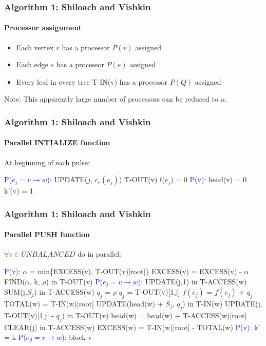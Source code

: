 \documentclass{beamer}
\begin{document}
\begin{frame}
\frametitle{Algorithm 1: Shiloach and Vishkin}
\framesubtitle{Processor assignment} 
\begin{itemize}
	\item Each vertex $v$ has a processor $P(v)$ assigned
	\item Each edge $e$ has a processor $P(e)$ assigned
	\item Every leaf in every tree T-IN(v) has a processor $P(Q)$ assigned
\end{itemize}
\bigskip
Note: This apparently large number of processors can be reduced to $n$.
\end{frame}

\begin{frame}
\frametitle{Algorithm 1: Shiloach and Vishkin}
\framesubtitle{Parallel INTIALIZE function} 
At beginning of each pulse:	
	\begin{algorithmic}[1]
		\State \textcolor{blue}{P($e_j = v \rightarrow w$):}
		\State UPDATE($j$, $c_r(e_j)$) T-OUT(v)
		\State f($e_j$) = 0
		\State \textcolor{blue}{P(v):}
		\State head(v) = 0	
		\State k'(v) = 1	
 	\EndFunction
	\end{algorithmic}
\end{frame}

\begin{frame}[allowframebreaks]
\frametitle{Algorithm 1: Shiloach and Vishkin}
\framesubtitle{Parallel PUSH function} 
\fontsize{10pt}{10}\selectfont
$\forall v \in UNBALANCED$ do in parallel:
	\begin{algorithmic}[1]
		\State \textcolor{blue}{P(v):}
		\State $\alpha$ = min\{EXCESS(v), T-OUT(v)[root]\} 
		\State EXCESS(v) = EXCESS(v) - $\alpha$
		\State FIND($\alpha$, k, $\rho$) in T-OUT(v)
		\State \textcolor{blue}{P($e_j = v \rightarrow w$):}
 		\State UPDATE(j,1) in T-ACCESS(w)
		\State SUM(j,$S_j$) in T-ACCESS(w)
			$q_j$ = $\rho$
		\Else
			\State $q_j$ = T-OUT(v)[1,j]
		\EndIf
		\State $f(e_j)$ = $f(e_j)$ + $q_j$
		\State TOTAL(w) = T-IN(w)[root]
		\State UPDATE(head(w) + $S_j$, $q_j$) in T-IN(w)
		\State UPDATE(j, T-OUT(v)[1,j] - $q_j$) in T-OUT(v)
		\State head(w) = head(w) + T-ACCESS(w)[root] 
		\State CLEAR(j) in T-ACCESS(w)
		\State EXCESS(w) = T-IN(w)[root] - TOTAL(w)
		\EndIf
		\State \textcolor{blue}{P(v):} k' = k
		\State \textcolor{blue}{P($e_d = v \rightarrow w$):}
			\State block v
		\EndIf
 	\EndFunction
	\end{algorithmic}
\end{frame}
\end{document}
